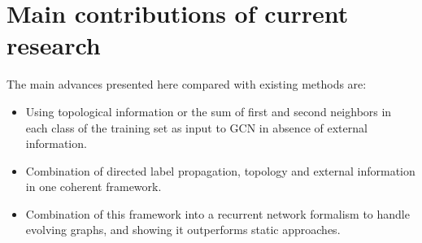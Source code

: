 \section{Main contributions of current research}
The main advances presented here compared with existing methods are:
\begin{itemize}
\item   Using topological information or the sum of first and second neighbors in each class of the training set as input to GCN in absence of external information.
\item   Combination of directed label propagation, topology and external information in one coherent framework.
\item   Combination of this framework into a recurrent network formalism to handle evolving graphs, and showing it outperforms static approaches. 
\end{itemize}
